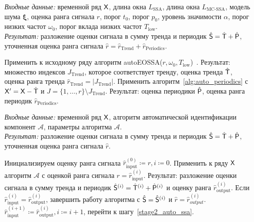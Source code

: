 \documentclass[specialist,
substylefile = spbu_report.rtx,
subf,12pt]{disser}
\newcommand{\Input}{\emph{Входные данные: }}
\newcommand{\Output}{\emph{Результат: }}
\theoremstyle{definition}
\begin{document}
\begin{algorithm}[!htbp]
	\caption{Алгоритм автоматической идентификации компонент, использующий критерий для проверкой гипотезы о наличии сигнала в шуме~\cite{Dudnik2025}}\label{alg:auto_periodic_trend}
	\Input временной ряд $\mathsf{X}$, длина окна $L_\text{SSA}$, длина окна $L_\text{MC-SSA}$, модель шума $\bm\xi$, оценка ранга сигнала $r$, порог $t_0$, порог $p_0$, уровень значимости $\alpha$, порог низких частот $\omega_0$, порог вклада низких частот $T_{\text{low}}$.\\
	\Output разложение оценки сигнала в сумму тренда и периодик $\hat{\mathsf{S}}=\hat{\mathsf{T}} + \hat{\mathsf{P}}$, уточненная оценка ранга сигнала $\hat{r}=\hat{r}_\text{Trend} + \hat{r}_\text{Periodics}$.
	\begin{algorithmic}[1]
		\State Применить к исходному ряду алгоритм autoEOSSA($r, \omega_0, T_{\text{low}}$)~\cite{autoSSA}. Результат: множество индексов $J_\text{Trend}$, которое соответствует тренду, оценка тренда $\hat{\mathsf{T}}$, оценка ранга тренда $\hat{r}_\text{Trend}=|J_\text{Trend}|$.
		\State Применить алгоритм~\ref{alg:auto_periodics} с $\mathsf{X}^\prime = \mathsf{X} - \hat{\mathsf{T}}$ и $J=\{1,\ldots,r\} \setminus  J_\text{Trend}$. Результат: оценка периодики $\hat{\mathsf{P}}$, оценка ранга периодик $\hat{r}_\text{Periodics}$.
	\end{algorithmic}
\end{algorithm}

\begin{algorithm}[!htbp]
	\caption{Алгоритм SSA-Aid с обновляемой оценкой ранга сигнала~\cite{Dudnik2025}}\label{alg:auto_ssa}
	\Input временной ряд $\mathsf{X}$, алгоритм автоматической идентификации компонент $\mathcal{A}$, параметры алгоритма $\mathcal{A}$.\\
	\Output разложение оценки сигнала в сумму тренда и периодик $\hat{\mathsf{S}}=\hat{\mathsf{T}} + \hat{\mathsf{P}}$, уточненная оценка ранга сигнала $\hat{r}$.
	\begin{algorithmic}[1]
		\State Инициализируем оценку ранга сигнала $\hat{r}_\text{input}^{(0)} \coloneq r, i \coloneq 0$.
		\State \label{stage2_auto_ssa}Применить к ряду $\mathsf{X}$ алгоритм $\mathcal{A}$ с оценкой ранга сигнала $r=\hat{r}_\text{input}^{(i)}$. Результат: разложение оценки сигнала в сумму тренда и периодик $\hat{\mathsf{S}}^{(i)}=\hat{\mathsf{T}}^{(i)}+\hat{\mathsf{P}}^{(i)}$ и оценку ранга $\hat{r}_\text{output}^{(i)}$.
		\State  Если $\hat{r}_\text{input}^{(i)}=\hat{r}_\text{output}^{(i)}$, завершить работу алгоритма с $\hat{\mathsf{S}}=\hat{\mathsf{S}}^{(i)}$ и $\hat{r}=\hat{r}_{output}^{(i)}$.
		\State $\hat{r}_\text{input}^{(i+1)} \coloneq \hat{r}_\text{output}^{(i)}, i \coloneq  i + 1$, перейти к шагу~\ref{stage2_auto_ssa}.
	\end{algorithmic}
\end{algorithm}
\end{document}
